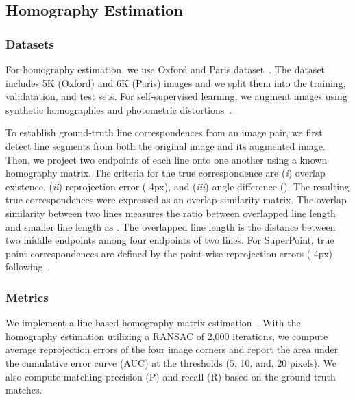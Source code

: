 \documentclass[letterpaper, 10 pt, journal, twoside]{ieeetran}
\begin{document}
\subsection{Homography Estimation}

\subsubsection{Datasets}

For homography estimation, we use Oxford and Paris dataset~\cite{Radenovic2018}. The dataset includes 5K (Oxford) and 6K (Paris) images and we split them into the training, validatation, and test sets. For self-supervised learning, we augment images using synthetic homographies and photometric distortions~\cite{DeTone2017, Sarlin2019, Revaud2019}.

To establish ground-truth line correspondences from an image pair, we first detect line segments from both the original image and its augmented image. Then, we project two endpoints of each line onto one another using a known homography matrix. The criteria for the true correspondence are (\textit{i}) overlap existence, (\textit{ii}) reprojection error ( \unit{4}{px}), and (\textit{iii}) angle difference (). The resulting true correspondences were expressed as an overlap-similarity matrix. The overlap similarity between two lines measures the ratio between overlapped line length and smaller line length as . The overlapped line length  is the distance between two middle endpoints among four endpoints of two lines. For SuperPoint, true point correspondences are defined by the point-wise reprojection errors  ( \unit{4}{px}) following~\cite{Sarlin2019}.



\subsubsection{Metrics}

We implement a line-based homography matrix estimation~\cite{Dubrofsky2008}. With the homography estimation utilizing a \ac{RANSAC} of 2,000 iterations, we compute average reprojection errors of the four image corners and report the area under the cumulative error curve (AUC) at the thresholds (5, 10, and, 20 pixels). We also compute matching precision (P) and recall (R) based on the ground-truth matches.
\end{document}

